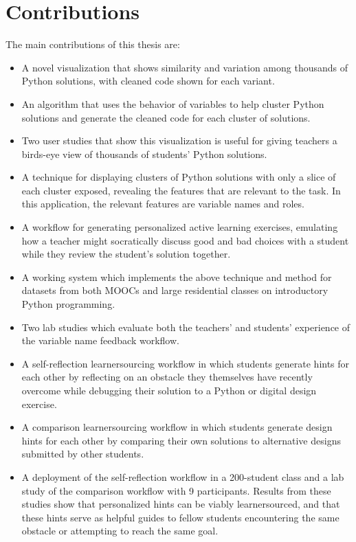 \section{Contributions}

The main contributions of this thesis are:
\begin{itemize}
\item A novel visualization that shows similarity and variation among thousands of Python solutions, with cleaned code shown for each variant. 
\item An algorithm that uses the behavior of variables to help cluster Python solutions and generate the cleaned code for each cluster of solutions.
\item Two user studies that show this visualization is useful for giving teachers a birds-eye view of thousands of students' Python solutions.
\item A technique for displaying clusters of Python solutions with only a slice of each cluster exposed, revealing the features that are relevant to the task. In this application, the relevant features are variable names and roles.
\item A workflow for generating personalized active learning exercises, emulating how a teacher might socratically discuss good and bad choices with a student while they review the student's solution together.
\item A working system which implements the above technique and method for datasets from both MOOCs and large residential classes on introductory Python programming.
\item Two lab studies which evaluate both the teachers' and students' experience of the variable name feedback workflow.
\item{A self-reflection learnersourcing workflow in which students generate hints for each other by reflecting on an obstacle they themselves have recently overcome while debugging their solution to a Python or digital design exercise.}
\item{A comparison learnersourcing workflow in which students generate design hints for each other by comparing their own solutions to alternative designs submitted by other students.} 
\item{A deployment of the self-reflection workflow in a 200-student class and a lab study of the comparison workflow with 9 participants. Results from these studies show that personalized hints can be viably learnersourced, and that these hints serve as helpful guides to fellow students encountering the same obstacle or attempting to reach the same goal.}
\end{itemize}

